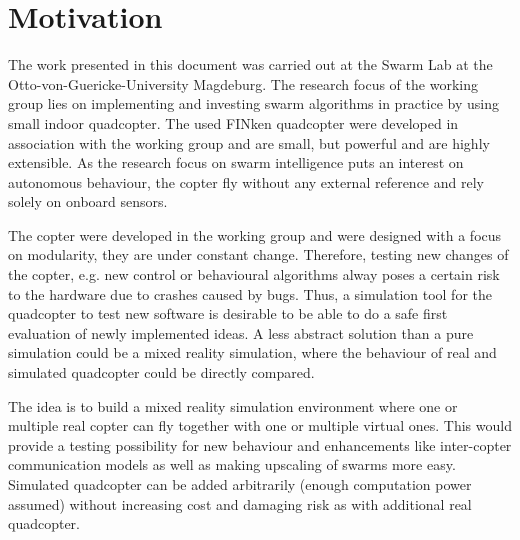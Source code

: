 

\section{Motivation}

The work presented in this document was carried out at the Swarm Lab at the Otto-von-Guericke-University Magdeburg. 
The research focus of the working group lies on implementing and investing swarm algorithms in practice by using small indoor quadcopter. 
The used FINken quadcopter were developed in association with the working group and are small, but powerful and are highly extensible. 
As the research focus on swarm intelligence puts an interest on autonomous behaviour, the copter fly without any external reference and rely solely on onboard sensors.

The copter were developed in the working group and were designed with a focus on modularity, they are under constant change. 
Therefore, testing new changes of the copter, e.g. new control or behavioural algorithms alway poses a certain risk to the hardware due to crashes caused by bugs. 
Thus, a simulation tool for the quadcopter to test new software is desirable to be able to do a safe first evaluation of newly implemented ideas. 
A less abstract solution than a pure simulation could be a mixed reality simulation, where the behaviour of real and simulated quadcopter could be directly compared.

The idea is to build a mixed reality simulation environment where one or multiple real copter can fly together with one or multiple virtual ones. 
This would provide a testing possibility for new behaviour and enhancements like inter-copter communication models as well as making upscaling of swarms more easy. 
Simulated quadcopter can be added arbitrarily (enough computation power assumed) without increasing cost and damaging risk as with additional real quadcopter. 

